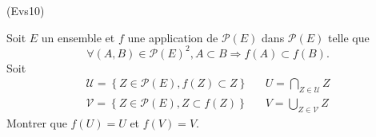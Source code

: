 \begin{tiny}(Evs10)\end{tiny} Soit $E$ un ensemble et $f$ une application de $\mathcal{P}(E)$ dans $\mathcal{P}(E)$ telle que
\[
\forall (A,B)\in \mathcal{P}(E)^{2},A\subset B\Rightarrow
f(A)\subset f(B).
\]
Soit
\begin{align*}
\mathcal{U}=\left\{ Z\in \mathcal{P}(E),f(Z)\subset Z\right\}  & &
U=\underset{Z\in \mathcal{U}}{\bigcap }Z \\
\mathcal{V}=\left\{ Z\in \mathcal{P}(E),Z\subset f(Z)\right\}  & &
V=\underset{Z\in \mathcal{V}}{\bigcup }Z
\end{align*}
Montrer que $f(U)=U$ et $f(V)=V$.
